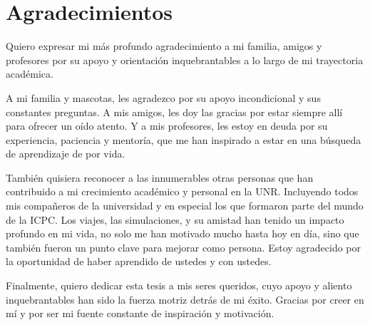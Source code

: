 \chapter*{Agradecimientos}

Quiero expresar mi más profundo agradecimiento a mi familia, amigos y profesores por su apoyo y orientación inquebrantables a lo largo de mi trayectoria académica.

A mi familia y mascotas, les agradezco por su apoyo incondicional y sus constantes preguntas. A mis amigos, les doy las gracias por estar siempre allí para ofrecer un oído atento. Y a mis profesores, les estoy en deuda por su experiencia, paciencia y mentoría, que me han inspirado a estar en una búsqueda de aprendizaje de por vida.

También quisiera reconocer a las innumerables otras personas que han contribuido a mi crecimiento académico y personal en la UNR. Incluyendo todos mis compañeros de la universidad y en especial los que formaron parte del mundo de la ICPC. Los viajes, las simulaciones, y su amistad han tenido un impacto profundo en mi vida, no solo me han motivado mucho hasta hoy en día, sino que también fueron un punto clave para mejorar como persona. Estoy agradecido por la oportunidad de haber aprendido de ustedes y con ustedes.

Finalmente, quiero dedicar esta tesis a mis seres queridos, cuyo apoyo y aliento inquebrantables han sido la fuerza motriz detrás de mi éxito. Gracias por creer en mí y por ser mi fuente constante de inspiración y motivación.
